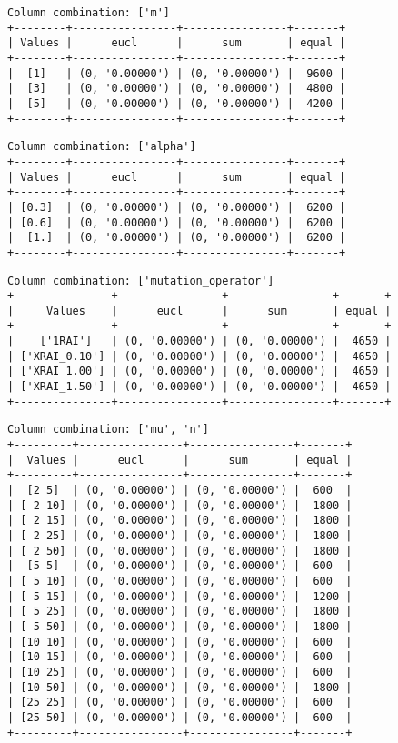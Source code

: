 \documentclass{article}
\begin{document}
\begin{verbatim}
Column combination: ['m']
+--------+----------------+----------------+-------+
| Values |      eucl      |      sum       | equal |
+--------+----------------+----------------+-------+
|  [1]   | (0, '0.00000') | (0, '0.00000') |  9600 |
|  [3]   | (0, '0.00000') | (0, '0.00000') |  4800 |
|  [5]   | (0, '0.00000') | (0, '0.00000') |  4200 |
+--------+----------------+----------------+-------+
\end{verbatim}

\begin{verbatim}
Column combination: ['alpha']
+--------+----------------+----------------+-------+
| Values |      eucl      |      sum       | equal |
+--------+----------------+----------------+-------+
| [0.3]  | (0, '0.00000') | (0, '0.00000') |  6200 |
| [0.6]  | (0, '0.00000') | (0, '0.00000') |  6200 |
|  [1.]  | (0, '0.00000') | (0, '0.00000') |  6200 |
+--------+----------------+----------------+-------+
\end{verbatim}

\begin{verbatim}
Column combination: ['mutation_operator']
+---------------+----------------+----------------+-------+
|     Values    |      eucl      |      sum       | equal |
+---------------+----------------+----------------+-------+
|    ['1RAI']   | (0, '0.00000') | (0, '0.00000') |  4650 |
| ['XRAI_0.10'] | (0, '0.00000') | (0, '0.00000') |  4650 |
| ['XRAI_1.00'] | (0, '0.00000') | (0, '0.00000') |  4650 |
| ['XRAI_1.50'] | (0, '0.00000') | (0, '0.00000') |  4650 |
+---------------+----------------+----------------+-------+
\end{verbatim}

\begin{verbatim}
Column combination: ['mu', 'n']
+---------+----------------+----------------+-------+
|  Values |      eucl      |      sum       | equal |
+---------+----------------+----------------+-------+
|  [2 5]  | (0, '0.00000') | (0, '0.00000') |  600  |
| [ 2 10] | (0, '0.00000') | (0, '0.00000') |  1800 |
| [ 2 15] | (0, '0.00000') | (0, '0.00000') |  1800 |
| [ 2 25] | (0, '0.00000') | (0, '0.00000') |  1800 |
| [ 2 50] | (0, '0.00000') | (0, '0.00000') |  1800 |
|  [5 5]  | (0, '0.00000') | (0, '0.00000') |  600  |
| [ 5 10] | (0, '0.00000') | (0, '0.00000') |  600  |
| [ 5 15] | (0, '0.00000') | (0, '0.00000') |  1200 |
| [ 5 25] | (0, '0.00000') | (0, '0.00000') |  1800 |
| [ 5 50] | (0, '0.00000') | (0, '0.00000') |  1800 |
| [10 10] | (0, '0.00000') | (0, '0.00000') |  600  |
| [10 15] | (0, '0.00000') | (0, '0.00000') |  600  |
| [10 25] | (0, '0.00000') | (0, '0.00000') |  600  |
| [10 50] | (0, '0.00000') | (0, '0.00000') |  1800 |
| [25 25] | (0, '0.00000') | (0, '0.00000') |  600  |
| [25 50] | (0, '0.00000') | (0, '0.00000') |  600  |
+---------+----------------+----------------+-------+
\end{verbatim}
\end{document}
